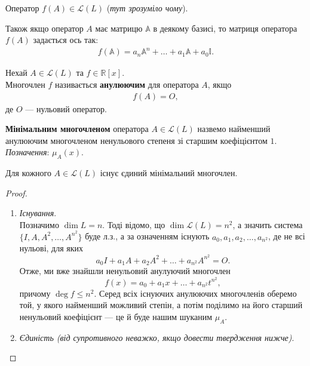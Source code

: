 \documentclass{math_library}
\begin{document}
\begin{remark}
Оператор $f(A) \in \mathcal{L}(L)$ (\textit{тут зрозуміло чому}).
\end{remark}

\begin{remark}
Також якщо оператор $A$ має матрицю $\mathbb{A}$ в деякому базисі, то матриця оператора $f(A)$ задається ось так:
\begin{align*}
f(\mathbb{A}) = a_n \mathbb{A}^n + \dots + a_1 \mathbb{A} + a_0 \mathbb{I}.
\end{align*}
\end{remark}

\begin{definition}
Нехай $A \in \mathcal{L}(L)$ та $f \in \mathbb{R}[x]$.\\
Многочлен $f$ називається \textbf{анулюючим} для оператора $A$, якщо
\begin{align*}
f(A) = O,
\end{align*}
де $O$ --- нульовий оператор.
\end{definition}

\begin{definition}
\textbf{Мінімальним многочленом} оператора $A \in \mathcal{L}(L)$ назвемо найменший анулюючим многочленом ненульового степеня зі старшим коефіцієнтом $1$.\\
\textit{Позначення}: $\mu_A(x)$.
\end{definition}

\begin{proposition}
Для кожного $A \in \mathcal{L}(L)$ існує єдиний мінімальний многочлен.
\end{proposition}

\begin{proof}
\begin{enumerate}[topsep=0pt,wide=0pt,label={\Roman*.}]
\item \textit{Існування}.\\
Позначимо $\dim L = n$. Тоді відомо, що $\dim \mathcal{L}(L) = n^2$, а значить система $\{I,A,A^2,\dots,A^{n^2}\}$ буде л.з., а за означенням існують $a_0,a_1,a_2,\dots,a_{n^2}$, де не всі нульові, для яких 
\[
a_0I + a_1A + a_2A^2 + \dots + a_{n^2} A^{n^2} = O.
\]
Отже, ми вже знайшли ненульовий анулуючий многочлен 
\[
f(x) = a_0 + a_1x + \dots + a_{n^2}t^{n^2},
\]
причому $\deg f \leq n^2$. Серед всіх існуючих анулюючих многочленів оберемо той, у якого найменший можливий степін, а потім поділимо на його старший ненульовий коефіцієнт --- це й буде нашим шуканим $\mu_A$.

\item \textit{Єдиність (від супротивного неважко, якщо довести твердження нижче)}. \qedhere
\end{enumerate}
\end{proof}
\end{document}
